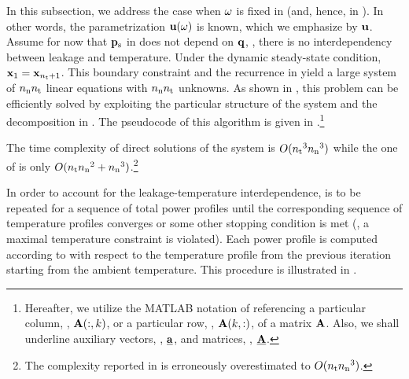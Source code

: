 In this subsection, we address the case when $\omega$ is fixed in  (and, hence, in ).
In other words, the parametrization $\mathbf{u}(\omega)$ is known, which we emphasize by $\mathbf{u}$.
Assume for now that $\mathbf{p}_{\text{s}}$ in  does not depend on $\mathbf{q}$, \ie, there is no interdependency between leakage and temperature.
Under the dynamic steady-state condition, $\mathbf{x}_1 = \mathbf{x}_{{n_\text{t}} + 1}$.
This boundary constraint and the recurrence in  yield a large system of ${n_\text{n}} {n_\text{t}}$ linear equations with ${n_\text{n}} {n_\text{t}}$ unknowns.
As shown in \cite{ukhov2012}, this problem can be efficiently solved by exploiting the particular structure of the system and the decomposition in .
The pseudocode of this algorithm is given in .\footnote{Hereafter, we utilize the MATLAB notation of referencing a particular column, \eg, $\mathbf{A}(:, k)$, or a particular row, \eg, $\mathbf{A}(k, :)$, of a matrix $\mathbf{A}$. Also, we shall underline auxiliary vectors, \eg, $\underline{\mathbf{a}}$, and matrices, \eg, $\underline{\mathbf{A}}$.}


The time complexity of direct solutions of the system is $O({n_\text{t}}^3 {n_\text{n}}^3)$ while the one of  is only $O({n_\text{t}} {n_\text{n}}^2 + {n_\text{n}}^3)$.\footnote{The complexity reported in \cite{ukhov2012} is erroneously overestimated to $O({n_\text{t}} {n_\text{n}}^3)$.}

In order to account for the leakage-temperature interdependence,  is to be repeated for a sequence of total power profiles until the corresponding sequence of temperature profiles converges or some other stopping condition is met (\eg, a maximal temperature constraint is violated).
Each power profile is computed according to  with respect to the temperature profile from the previous iteration starting from the ambient temperature.
This procedure is illustrated in .

